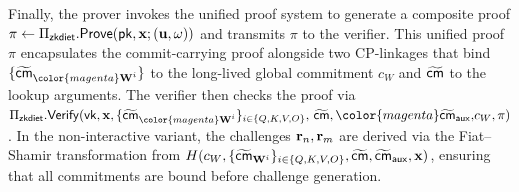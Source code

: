 \documentclass[sigconf,anonymous,review,balance=false]{acmart}
\newcommand{\rev}[1]{{\color{magenta}#1}}
\begin{document}
Finally, the prover invokes the unified proof system to generate a composite proof $\pi \gets \Pi_{\mathsf{zkdiet}}.{\sf Prove}({\sf pk}, {\mathbf{x}}; ({\mathbf{u}}, {\mathbf{\omega}}))$ and transmits $\pi$ to the verifier.
This unified proof $\pi$ encapsulates the commit-carrying proof alongside two CP-linkages that bind $\{\widetilde{\cm}_{\rev{\W}^i}\}$ to the long-lived global commitment $c_W$ and $\widetilde{{\sf cm}}$ to the lookup arguments.
The verifier then checks the proof via $\Pi_{\mathsf{zkdiet}}.\verify(\vk, \ins, \{\widetilde{\cm}_{\rev{\W}^i}\}_{i \in \{Q,K,V,O\}},\, \widetilde{\cm}, \rev{\widetilde{\cm}_{\mathsf{aux}},} c_W, \pi)$.
In the non-interactive variant, the challenges ${\mathbf{r}}_n, {\mathbf{r}}_m$ are derived via the Fiat--Shamir transformation from \rev{$H(c_W, \{\widetilde{{\sf cm}}_{{\mathbf{W}}^i}\}_{i \in \{Q,K,V,O\}}, \widetilde{{\sf cm}}, \widetilde{{\sf cm}}_{\mathsf{aux}}, {\mathbf{x}})$}, ensuring that all commitments are bound before challenge generation.

\end{document}
